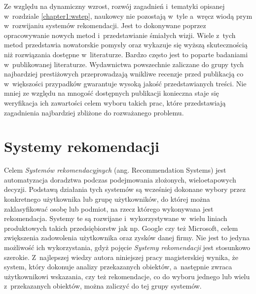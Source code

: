 \documentclass[../Kamil_Kowalewski_Main.tex]{subfiles}
\begin{document}
 {

    Ze względu na dynamiczny wzrost, rozwój zagadnień i~tematyki opisanej w~rozdziale
    \ref{chapter1:wstep}, naukowcy nie pozostają w~tyle a~wręcz wiodą prym w~rozwijaniu
    systemów rekomendacji. Jest to dokonywane poprzez opracowywanie nowych metod
    i~przedstawianie śmiałych wizji. Wiele z~tych metod przedstawia nowatorskie pomysły
    oraz wykazuje się wyższą skutecznością niż rozwiązania dostępne w~literaturze.
    Bardzo często jest to poparte badaniami w~publikowanej literaturze. Wydawnictwa
    powszechnie zaliczane do grupy tych najbardziej prestiżowych przeprowadzają
    wnikliwe recenzje przed publikacją co w~większości przypadków gwarantuje wysoką
    jakość przedstawianych treści. Nie mniej ze względu na mnogość dostępnych
    publikacji konieczna staje się weryfikacja ich zawartości celem wyboru takich prac,
    które przedstawiają zagadnienia najbardziej zbliżone do rozważanego problemu.

    \section{Systemy rekomendacji}
    \label{chapter2:przeglad_literatury:systemy_rekomendacji} {
        Celem \textit{Systemów rekomendacyjnych} \cite{website:recommendation_systems}
        (ang. Recommendation Systems) jest automatyzacja doradztwa podczas podejmowania
        złożonych, wieloetapowych decyzji. Podstawą działania tych systemów są
        wcześniej dokonane wybory przez konkretnego użytkownika lub grupę użytkowników,
        do której można zaklasyfikować osobę lub podmiot, na rzecz którego wykonywana
        jest rekomendacja. Systemy te są rozwijane i~wykorzystywane w~wielu liniach
        produktowych takich przedsiębiorstw jak np. Google\cite{website:google} czy też
        Microsoft\cite{website:microsoft}, celem zwiększenia zadowolenia użytkownika
        oraz zysków danej firmy. Nie jest to jedyna możliwość ich wykorzystania, gdyż
        pojęcie \textit{Systemy rekomendacji} jest stosunkowo szerokie. Z~najlepszej
        wiedzy autora niniejszej pracy magisterskiej wynika, że system, który dokonuje
        analizy przekazanych obiektów, a~następnie zwraca użytkownikowi wskazania, czy
        też rekomendacje, co do wyboru jednego lub wielu z~przekazanych obiektów, można
        zaliczyć do tej grupy systemów.
    }

}
\end{document}
